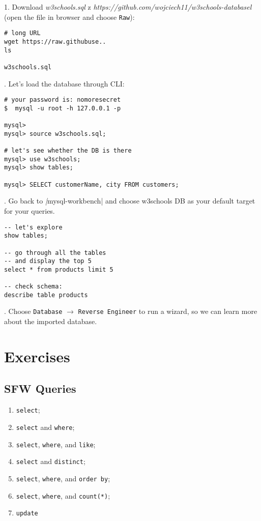 \documentclass[12pt, letterpaper]{article}
\begin{document}
\bigskip

1. Download \emph{w3schools.sql} z \emph{https://github.com/wojciech11/w3schools-databasel} (open the file in browser and choose \verb|Raw|):

\begin{verbatim}
# long URL
wget https://raw.githubuse..
ls

w3schools.sql
\end{verbatim}

. Let's load the database through \small{CLI}:

\begin{verbatim}
# your password is: nomoresecret
$  mysql -u root -h 127.0.0.1 -p

mysql>
mysql> source w3schools.sql;

# let's see whether the DB is there
mysql> use w3schools;
mysql> show tables;

mysql> SELECT customerName, city FROM customers;
\end{verbatim}

. Go back to \emph|mysql-workbench| and choose w3schools DB as your default target for your queries.

\begin{verbatim}
-- let's explore
show tables;

-- go through all the tables
-- and display the top 5
select * from products limit 5

-- check schema:
describe table products
\end{verbatim}

. Choose \verb|Database| $\rightarrow$ \verb|Reverse Engineer| to run a wizard, so we can learn more about the imported database.


\section{Exercises}

\subsection{SFW Queries}

\begin{enumerate}
 \item \verb|select|;
 \item \verb|select| and \verb|where|;
 \item \verb|select|, \verb|where|, and \verb|like|;
 \item \verb|select| and \verb|distinct|;
 \item \verb|select|, \verb|where|, and \verb|order by|;
 \item \verb|select|, \verb|where|, and \verb|count(*)|;
 \item \verb|update|
\end{enumerate}
\end{document}
